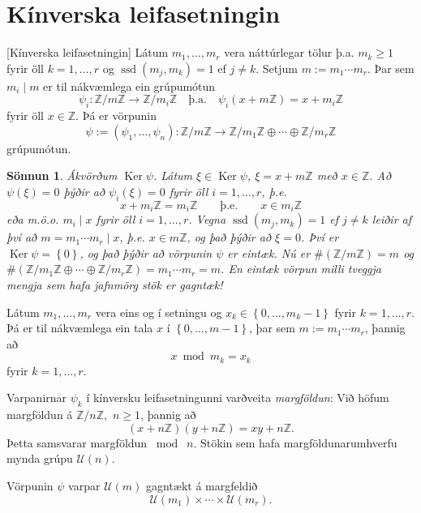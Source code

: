 \documentclass[a4paper,icelandic,11pt]{book}
\theoremstyle{plain}
\newtheorem*{sonnun}{Sönnun}
\newcommand{\Z}{\mathbb{Z}}
\DeclareMathOperator{\ssd}{ssd} %
\DeclareMathOperator{\Ker}{Ker} %
\begin{document}
\section{Kínverska leifasetningin}
\begin{setn}
  [Kínverska leifasetningin]
  Látum $m_1,\dots,m_r$ vera náttúrlegar tölur þ.a. $m_k\ge 1$ fyrir öll
  $k=1,\dots,r$ og $\ssd(m_j,m_k)=1$ ef $j\neq k$. Setjum $m:=m_1\cdots m_r$. Þar
  sem $m_i \mid m$ er til nákvæmlega ein grúpumótun
 \[
  \psi_i : \Z/m\Z\to \Z/m_i\Z
  \quad\text{þ.a.}\quad
  \psi_i(x+m\Z) = x+m_i\Z
 \]
  fyrir öll $x\in \Z$. Þá er vörpunin
 \[
  \psi := (\psi_1,\dots,\psi_n):\Z/m\Z \to \Z/m_1\Z\oplus\cdots\oplus\Z/m_r\Z
 \]
  grúpumótun.
\end{setn}
\begin{sonnun}
  Ákvörðum $\Ker\psi$. Látum $\xi\in\Ker\psi$, $\xi=x+m\Z$ með $x\in\Z$. Að
  $\psi(\xi)= 0$ þýðir að $\psi_i(\xi) = 0$ fyrir öll $i=1,\dots,r$, þ.e.
  \begin{equation*}
    x + m_i\Z
    = m_i \Z
    \qquad\text{þ.e.}\qquad
    x\in m_i\Z
  \end{equation*}
  eða m.ö.o. $m_i\mid x$ fyrir öll $i=1,\dots,r$. Vegna $\ssd(m_j,m_k)=1$ ef
  $j\neq k$ leiðir af því að $m=m_1\cdots m_r \mid x$, þ.e. $x\in m\Z$, og það
  þýðir að $\xi = 0$. Því er $\Ker\psi = \left\{ 0 \right\}$, og það þýðir að
  vörpunin $\psi$ er eintæk. Nú er $\#(\Z/m\Z) = m$ og $\#(\Z/m_1\Z\oplus
  \cdots \oplus \Z/m_r\Z) = m_1\cdots m_r = m$. En eintæk vörpun milli tveggja
  mengja sem hafa jafnmörg stök er gagntæk!
\end{sonnun}
\begin{fylgisetn}
  Látum $m_1,\dots,m_r$ vera eins og í setningu og $x_k \in \left\{
  0,\dots,m_{k} - 1
  \right\}$ fyrir $k=1,\dots,r$. Þá er til nákvæmlega ein tala $x$ í $\left\{
  0,\dots,m-1 \right\}$, þar sem $m:=m_1\cdots m_r$, þannig að 
  \begin{equation*}
    x\bmod m_k = x_k
  \end{equation*}
  fyrir $k = 1,\dots,r$.
\end{fylgisetn}
Varpanirnar $\psi_k$ í kínversku leifasetningunni varðveita \emph{margföldun}:
Við höfum margföldun á $\Z/n\Z,$ $n\ge 1$, þannig að 
\[
(x+n\Z)(y+n\Z) = xy + n\Z.
\]
Þetta samsvarar margföldun $\bmod\;n$. Stökin sem hafa margföldunarumhverfu
mynda grúpu $\mathcal U(n)$.
\begin{setn}
  Vörpunin $\psi$ varpar $\mathcal U(m)$ gagntækt á margfeldið
  \begin{equation*}
    \mathcal U(m_1)\times\cdots\times \mathcal U(m_r).
  \end{equation*}
\end{setn}
\end{document}
